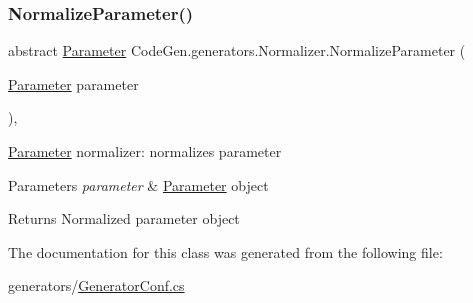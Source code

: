 \subsubsection{\texorpdfstring{Normalize\+Parameter()}{NormalizeParameter()}}
{\footnotesize\ttfamily abstract \mbox{\hyperlink{classCodeGen_1_1generators_1_1Parameter}{Parameter}} Code\+Gen.\+generators.\+Normalizer.\+Normalize\+Parameter (\begin{DoxyParamCaption}\item[{\mbox{\hyperlink{classCodeGen_1_1generators_1_1Parameter}{Parameter}}}]{parameter }\end{DoxyParamCaption})\hspace{0.3cm}{\ttfamily [protected]}, {}}



\mbox{\hyperlink{classCodeGen_1_1generators_1_1Parameter}{Parameter}} normalizer\+: normalizes parameter 


\begin{DoxyParams}{Parameters}
{\em parameter} & \mbox{\hyperlink{classCodeGen_1_1generators_1_1Parameter}{Parameter}} object\\
\hline
\end{DoxyParams}
\begin{DoxyReturn}{Returns}
Normalized parameter object
\end{DoxyReturn}


The documentation for this class was generated from the following file\+:\begin{DoxyCompactItemize}
\item 
generators/\mbox{\hyperlink{GeneratorConf_8cs}{Generator\+Conf.\+cs}}\end{DoxyCompactItemize}
